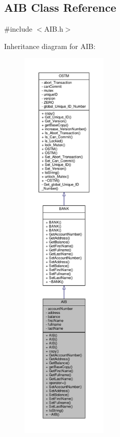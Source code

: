 \hypertarget{class_a_i_b}{}\subsection{A\+IB Class Reference}
\label{class_a_i_b}


{\ttfamily \#include $<$A\+I\+B.\+h$>$}



Inheritance diagram for A\+IB\+:\nopagebreak
\begin{figure}[H]
\begin{center}
\leavevmode
\includegraphics[height=550pt]{class_a_i_b__inherit__graph}
\end{center}
\end{figure}


